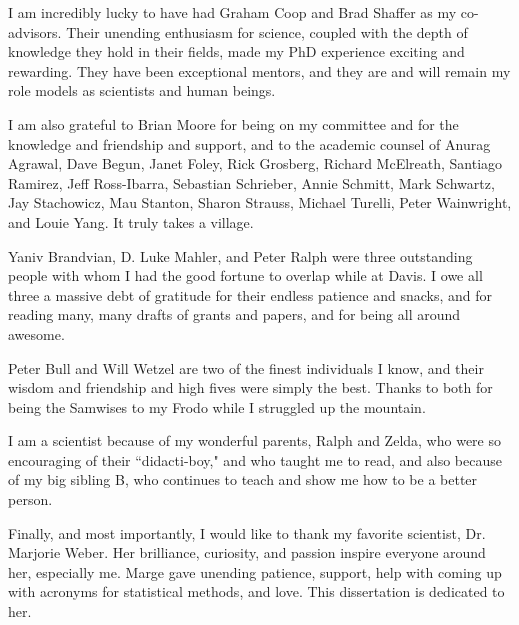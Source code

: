 \begin{frontmatter}
\begin{acknowledgments}
\par I am incredibly lucky to have had Graham Coop and Brad Shaffer as my co-advisors.  Their unending enthusiasm for science, coupled with the depth of knowledge they hold in their fields, made my PhD experience exciting and rewarding.  They have been exceptional mentors, and they are and will remain my role models as scientists and human beings.
\par I am also grateful to Brian Moore for being on my committee and for the knowledge and friendship and support, and to the academic counsel of Anurag Agrawal, Dave Begun, Janet Foley, Rick Grosberg, Richard McElreath, Santiago Ramirez, Jeff Ross-Ibarra, Sebastian Schrieber, Annie Schmitt, Mark Schwartz, Jay Stachowicz, Mau Stanton, Sharon Strauss, Michael Turelli, Peter Wainwright, and Louie Yang.  It truly takes a village.
\par Yaniv Brandvian, D. Luke Mahler, and Peter Ralph were three outstanding people with whom I had the good fortune to overlap while at Davis.  I  owe all three a massive debt of gratitude for their endless patience and snacks, and for reading many, many drafts of grants and papers, and for being all around awesome.
\par Peter Bull and Will Wetzel are two of the finest individuals I know, and their wisdom and friendship and high fives were simply the best.  Thanks to both for being the Samwises to my Frodo while I struggled up the mountain.
\par I am a scientist because of my wonderful parents, Ralph and Zelda, who were so encouraging of their ``didacti-boy," and who taught me to read, and also because of my big sibling B, who continues to teach and show me how to be a better person.
\par Finally, and most importantly, I would like to thank my favorite scientist, Dr. Marjorie Weber.  Her brilliance, curiosity, and passion inspire everyone around her, especially me.  Marge gave unending patience, support, help with coming up with acronyms for statistical methods, and love.   This dissertation is dedicated to her.

\end{acknowledgments}

%


\end{frontmatter}
